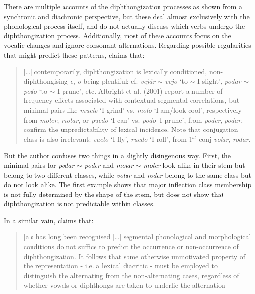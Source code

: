 There are multiple accounts of the diphthongization processes as shown  from a synchronic \autocites{Bellido.1986, Carreira.1991, Harris.1985, Kikuchi.1997} and diachronic \autocite{Wilkinson.1971} perspective, but these deal almost exclusively with the phonological process itself, and do not actually discuss which verbs undergo the diphthongization process. Additionally, most of these accounts focus on the vocalic changes and ignore consonant alternations. Regarding possible regularities that might predict these patterns, \textcite[423]{Roca.2010} claims that:

\begin{quotation}
[\dots] contemporarily, diphthongization is lexically conditioned, non-diph\-thong\-i\-s\-ing \textit{e}, \textit{o} being plentiful: cf. \textit{vejár} $\sim$ \textit{vejo} `to $\sim$ I slight', \textit{podar} $\sim$ \textit{podo} `to $\sim$ I prune', etc. Albright et al. (2001) report a number of frequency effects associated with contextual segmental correlations, but minimal pairs like \textit{muelo} `I grind' vs. \textit{molo} `I am/look cool', respectively from \textit{moler}, \textit{molar}, or \textit{puedo} `I can' vs. \textit{podo} `I prune', from \textit{poder}, \textit{podar}, confirm the unpredictability of lexical incidence. Note that conjugation class is also irrelevant: \textit{vuelo} `I fly', \textit{ruedo} `I roll', from 1$^{st}$ conj \textit{volar}, \textit{rodar}.
\end{quotation}

But the author confuses two things in a slightly disingenous way. First, the minimal pairs for \textit{podar} $\sim$ \textit{poder} and \textit{molar} $\sim$ \textit{moler} look alike in their stem but belong to two different classes, while \textit{volar} and \textit{rodar} belong to the same class but do not look alike. The first example shows that major inflection class membership is not fully determined by the shape of the stem, but does not show that diphthongization is not predictable within classes.

In a similar vain, \textcite[32]{Harris.1985} claims that:

\begin{quotation}
[a]s has long been recognised [\dots] segmental phonological  and morphological conditions do not suffice to predict the occurrence or non-occurrence of diphthongization. It follows that some otherwise unmotivated property of the representation - i.e. a lexical diacritic - must be employed to distinguish the alternating from the non-alternating cases, regardless of whether vowels or diphthongs are taken to underlie the alternation
\end{quotation}

